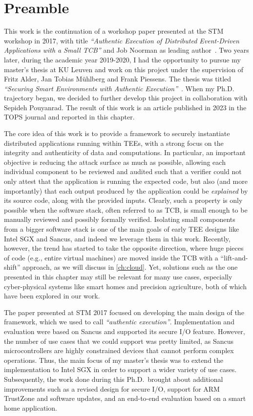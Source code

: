 \section*{Preamble}

This work is the continuation of a workshop paper presented at the STM workshop
in 2017, with title \emph{``Authentic Execution of Distributed Event-Driven
Applications with a Small TCB''} and Job Noorman as leading
author~\cite{noorman:authentic-execution}. Two years later, during the academic
year 2019-2020, I had the opportunity to pursue my master's thesis at KU Leuven
and work on this project under the supervision of Fritz Alder, Jan Tobias
M\"{u}hlberg and Frank Piessens. The thesis was titled \emph{``Securing Smart
Environments with Authentic Execution''}~\cite{scopelliti2020thesis}. When my
Ph.D. trajectory began, we decided to further develop this project in
collaboration with Sepideh Pouyanrad. The result of this work is an article
published in 2023 in the TOPS journal and reported in this chapter.

The core idea of this work is to provide a framework to securely instantiate
distributed applications running within \acsp{TEE}, with a strong focus on the
integrity and authenticity of data and computations. In particular, an important
objective is reducing the attack surface as much as possible, allowing each
individual component to be reviewed and audited such that a verifier could not
only attest that the application is running the expected code, but also (and
more importantly) that each output produced by the application could be
\emph{explained} by its source code, along with the provided inputs. Clearly,
such a property is only possible when the software stack, often referred to as
\ac{TCB}, is small enough to be manually reviewed and possibly formally
verified. Isolating small components from a bigger software stack is one of the
main goals of early \acs{TEE} designs like Intel \acs{SGX} and Sancus, and
indeed we leverage them in this work. Recently, however, the trend has started
to take the opposite direction, where huge pieces of code (e.g., entire virtual
machines) are moved inside the \ac{TCB} with a ``lift-and-shift'' approach, as
we will discuss in \cref{ch:cloud}. Yet, solutions such as the one presented in
this chapter may still be relevant for many use cases, especially cyber-physical
systems like smart homes and precision agriculture, both of which have been
explored in our work.

The paper presented at STM 2017 focused on developing the main design of the
framework, which we used to call \emph{``authentic execution''}. Implementation
and evaluation were based on Sancus and supported its secure I/O feature.
However, the number of use cases that we could support was pretty limited, as
Sancus microcontrollers are highly constrained devices that cannot perform
complex operations. Thus, the main focus of my master's thesis was to extend the
implementation to Intel \acs{SGX} in order to support a wider variety of use
cases. Subsequently, the work done during this Ph.D.\ brought about additional
improvements such as a revised design for secure I/O, support for ARM TrustZone
and software updates, and an end-to-end evaluation based on a smart home
application.

